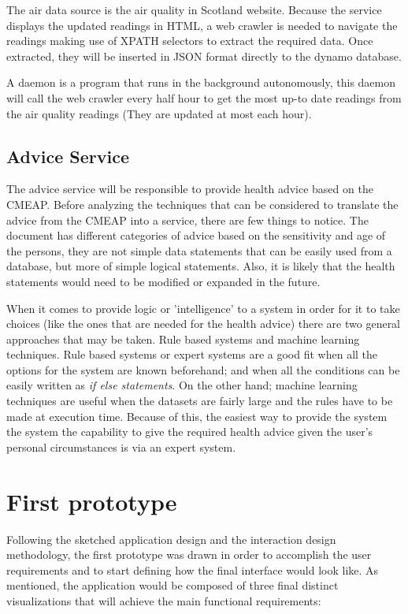  The air data source is the air quality in Scotland website. Because the service displays the updated readings in HTML, a web crawler is needed to navigate the readings making use of XPATH selectors to extract the required data. Once extracted, they will be inserted in JSON format directly to the dynamo database.
 
A daemon is a program that runs in the background autonomously, this daemon will call the web crawler every half hour to get the most up-to date readings from the air quality readings (They are updated at most each hour). 

\subsection{Advice Service}
The advice service will be responsible to provide health advice based on the CMEAP\cite{HealthProtectionAgencyfortheCommitteeontheMedicalEffectsofAirPollutants2011}. Before analyzing the techniques that can be considered to translate the advice from the CMEAP into a service, there are few things to notice. The document has different categories of advice based on the sensitivity and age of the persons, they are not simple data statements that can be easily used from a database, but more of simple logical statements. Also, it is likely that the health statements would need to be modified or expanded in the future. 

When it comes to provide logic or 'intelligence' to a system in order for it to take choices (like the ones that are needed for the health advice) there are two general approaches that may be taken. Rule based systems and machine learning techniques. Rule based systems or expert systems are a good fit when all the options for the system are known beforehand; and when all the conditions can be easily written as \textit{if else statements}. On the other hand; machine learning techniques are useful when the datasets are fairly large and the rules have to be made at execution time. Because of this, the easiest way to provide the system the system the capability to give the required health advice given the user's personal circumstances is via an expert system.

\section{First prototype}
Following the sketched application design and the interaction design methodology, the first prototype was drawn in order to accomplish the user requirements and to start defining how the final interface would look like. As mentioned, the application would be composed of three final distinct visualizations that will achieve the main functional requirements:

